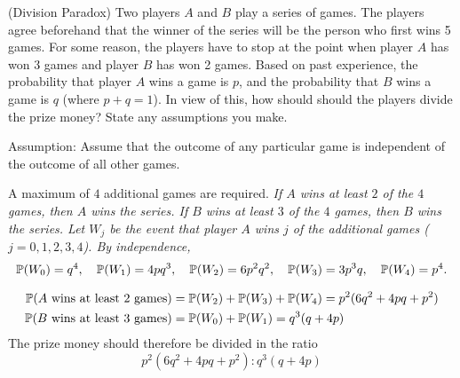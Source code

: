 \begin{exercise}
\begin{questions}
\question (Division Paradox)
Two players $A$ and $B$ play a series of games. The players agree beforehand that the winner of the series will be the person who first wins 5 games. For some reason, the players have to stop at the point when player $A$ has won 3 games and player $B$ has won 2 games. Based on past experience, the probability that player $A$ wins a game is $p$, and the probability that $B$ wins a game is $q$ (where $p+q=1$). In view of this, how should should the players divide the prize money? State any assumptions you make.

\begin{answer}
Assumption: Assume that the outcome of any particular game is independent of the outcome of all other games. 
\par
A maximum of $4$ additional games are required.
\bit
\it If $A$ wins at least $2$ of the $4$ games, then $A$ wins the series.
\it If $B$ wins at least $3$ of the $4$ games, then $B$ wins the series.
\eit
Let $W_j$ be the event that player $A$ wins $j$ of the additional games ($j=0,1,2,3,4$). By independence,
\begin{align*}
\mathbb{P}(W_0) = q^4,\quad
\mathbb{P}(W_1) = 4pq^3,\quad
\mathbb{P}(W_2) = 6p^2q^2,\quad
\mathbb{P}(W_3) = 3p^3q,\quad
\mathbb{P}(W_4) = p^4.
\end{align*}

\small
\begin{align*}
\mathbb{P}(\text{$A$ wins at least $2$ games}) & = \mathbb{P}(W_2) + \mathbb{P}(W_3) + \mathbb{P}(W_4) = p^2(6q^2 + 4pq + p^2) \\
\mathbb{P}(\text{$B$ wins at least $3$ games}) & = \mathbb{P}(W_0) + \mathbb{P}(W_1) = q^3(q + 4p)
\end{align*}
\normalsize
The prize money should therefore be divided in the ratio 
\[
p^2(6q^2 + 4pq + p^2) : q^3(q + 4p)
\]
\end{answer}


\end{questions}
\end{exercise}
